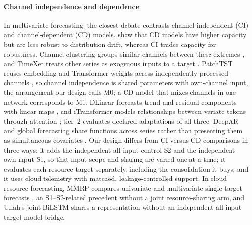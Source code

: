 \documentclass[5p,twocolumn]{elsarticle}
\begin{document}
\paragraph{Channel independence and dependence} In multivariate forecasting,
the closest debate contrasts channel-independent (CI) and channel-dependent
(CD) models. \citet{Han2024ChannelIndependent} show that CD models have
higher capacity but are less robust to distribution drift, whereas CI trades
capacity for robustness. Channel clustering groups similar channels between
these extremes \citep{Chen2024ChannelClustering}, and TimeXer treats other
series as exogenous inputs to a target \citep{Wang2024TimeXer}. PatchTST
reuses embedding and Transformer weights across independently processed
channels \citep{Nie2023PatchTST}, so channel independence is shared
parameters with own-channel input, the arrangement our design calls M0; a CD
model that mixes channels in one network corresponds to M1. DLinear
forecasts trend and residual components with linear maps
\citep{Zeng2023DLinear}, and iTransformer models relationships between
variate tokens through attention \citep{Liu2024iTransformer}; tier~2
evaluates declared adaptations of all three. DeepAR and global forecasting
share functions across series rather than presenting them as simultaneous
covariates \citep{Salinas2020DeepAR,MonteroManso2021GlobalForecasting}. Our
design differs from CI-versus-CD comparisons in three ways: it adds the
independent all-input control S2 and the independent own-input S1, so that
input scope and sharing are varied one at a time; it evaluates each resource
target separately, including the consolidation it buys; and it uses cloud
telemetry with matched, leakage-controlled support. In cloud resource
forecasting, MMRP compares univariate and multivariate single-target
forecasts \citep{Tripathi2025MMRP}, an S1--S2-related precedent without a
joint resource-sharing arm, and Ullah's joint BiLSTM shares a representation
without an independent all-input target-model bridge.
\end{document}
